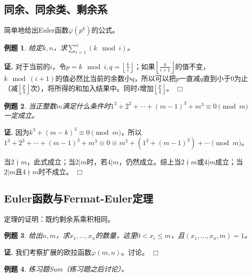 \documentclass{ctexart}
\newcommand{\ffloor}[1]{{ \left\lfloor #1 \right\rfloor }}
\newtheorem{exmp}{例题}[section]
\renewenvironment{proof}[1][证]{\noindent \textbf{#1.} }{\hfill$\Box$}
\begin{document}
\subsection{同余、同余类、剩余系}
简单地给出Euler函数$\varphi(p^k)$的公式。

\begin{exmp}
给定$k, n$，求$\sum_{i=1}^n(k \mod i)$。
\end{exmp}
\begin{proof}
对于当前的$i$，令$p=k \mod i, q=\ffloor{\frac{k}{i}}$；如果$\ffloor{\frac{k}{i+1}}$的值不变，$k \mod (i+1)$的值必然比当前的余数小$q$，所以可以把$p$一直减$q$直到小于$0$为止（减$\ffloor{\frac{p}{q}}$次），将所得的和加入结果中。同时$i$增加$\ffloor{\frac{p}{q}}$。
\end{proof}

\begin{exmp}
当正整数$m$满足什么条件时$1^3+2^3+\dotsb+(m-1)^3+m^3\equiv 0\pmod{m}$一定成立。
\end{exmp}
\begin{proof}
因为$k^3+(m-k)^3\equiv 0\pmod{m}$，所以$1^3+2^3+\dotsb+(m-1)^3+m^3\equiv 0\equiv m^3+(1^3+(m-1)^3)+\dotsb \pmod{m}$。

当$2\nmid m$，此式成立；当$2|m$时，若$4|m$，仍然成立。综上当$2\nmid m$或$4|m$成立；当$2|m$且$4\nmid m$时不成立。
\end{proof}

\subsection{Euler函数与Fermat-Euler定理}
定理的证明：既约剩余系乘积相同。

\begin{exmp}
给出$n, m$，求$x_1,\dotsc,x_n$的数量，这里$0< x_i \leq m$，且$(x_1,\dotsc,x_n,m)=1$。
\end{exmp}
\begin{proof}
我们考察扩展的欧拉函数$\varphi(m,n)$。讨论。
\end{proof}

\begin{exmp}
练习题Sum（练习题之后讨论）。
\end{exmp}
\end{document}
